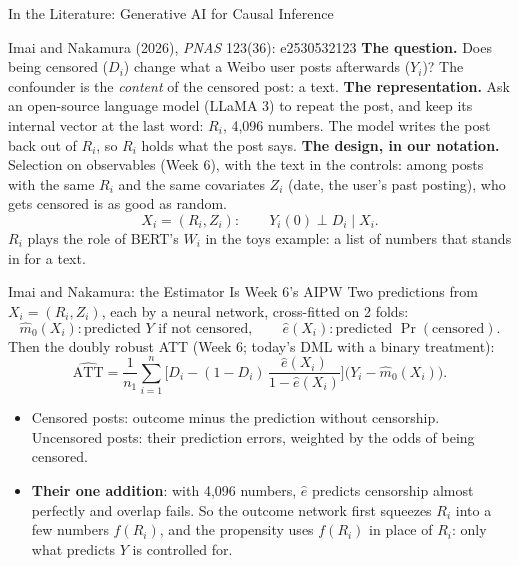 \documentclass[aspectratio=169,11pt,xcolor=dvipsnames]{beamer}
\begin{document}
\begin{frame}{In the Literature: Generative AI for Causal Inference}
\par{\footnotesize\color{gray}Imai and Nakamura (2026), \textit{PNAS} 123(36): e2530532123}\vskip4pt
\textbf{The question.} Does being censored ($D_i$) change what a Weibo user posts afterwards ($Y_i$)?
The confounder is the \emph{content} of the censored post: a text.
\vskip4pt
\textbf{The representation.} Ask an open-source language model (LLaMA 3) to repeat the post, and keep
its internal vector at the last word: $R_i$, 4,096 numbers. The model writes the post back out of
$R_i$, so $R_i$ holds what the post says.
\vskip4pt
\textbf{The design, in our notation.} Selection on observables (Week 6), with the text in the
controls: among posts with the same $R_i$ and the same covariates $Z_i$ (date, the user's past
posting), who gets censored is as good as random.
\[
  X_i = (R_i, Z_i) : \qquad Y_i(0) \perp D_i \mid X_i .
\]
{\small $R_i$ plays the role of BERT's $W_i$ in the toys example: a list of numbers that stands in for a text.}
\end{frame}

\begin{frame}{Imai and Nakamura: the Estimator Is Week 6's AIPW}
Two predictions from $X_i = (R_i, Z_i)$, each by a neural network, cross-fitted on 2 folds:
\[
  \hat m_0(X_i) : \text{predicted } Y \text{ if not censored}, \qquad
  \hat e(X_i) : \text{predicted } \Pr(\text{censored}) .
\]
Then the doubly robust ATT (Week 6; today's DML with a binary treatment):
\[
  \widehat{\text{ATT}} = \frac{1}{n_1}\sum_{i=1}^n \Big[ D_i - (1 - D_i)\,\frac{\hat e(X_i)}{1 - \hat e(X_i)} \Big]
  \big(Y_i - \hat m_0(X_i)\big) .
\]
\begin{itemize}\itemsep3pt
  \item Censored posts: outcome minus the prediction without censorship. Uncensored posts: their
        prediction errors, weighted by the odds of being censored.
  \item \textbf{Their one addition}: with 4,096 numbers, $\hat e$ predicts censorship almost perfectly
        and overlap fails. So the outcome network first squeezes $R_i$ into a few numbers $f(R_i)$,
        and the propensity uses $f(R_i)$ in place of $R_i$: only what predicts $Y$ is controlled for.
\end{itemize}
\end{frame}
\end{document}
